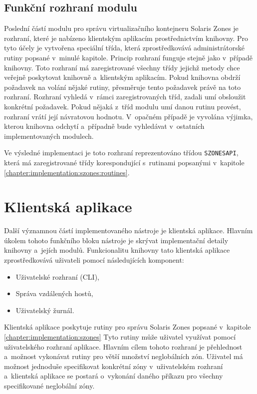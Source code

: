 \subsection{Funkční rozhraní modulu}
\label{chapter:implementation:szones:api}
Poslední částí modulu pro správu virtualizačního kontejneru Solaris Zones je rozhraní, které je nabízeno klientským aplikacím
prostřednictvím knihovny. Pro tyto účely je vytvořena speciální třída, která zprostředkovává administrátorské rutiny popsané 
v~minulé kapitole. Princip rozhraní funguje stejně jako v~případě knihovny. Toto rozhraní má zaregistrované všechny 
třídy jejichž metody chce veřejně poskytovat knihovně a~klientským aplikacím. Pokud knihovna obdrží požadavek na volání nějaké
rutiny, přesměruje tento požadavek právě na toto rozhraní. Rozhraní vyhledá v~rámci zaregistrovaných tříd, zadali umí obsloužit
konkrétní požadavek. Pokud nějaká z~tříd modulu umí danou rutinu provést, rozhraní vrátí její návratovou hodnotu. V~opačném případě
je vyvolána výjimka, kterou knihovna odchytí a~případně bude vyhledávat v~ostatních implementovaných modulech.

Ve výsledné implementaci je toto rozhraní reprezentováno třídou \verb|SZONESAPI|, která má zaregistrované třídy korespondující
s~rutinami popsanými v~kapitole \ref{chapter:implementation:szones:routines}.
\section{Klientská aplikace}
\label{chapter:implementation:client}
Další významnou částí implementovaného nástroje je klientská aplikace. Hlavním úkolem tohoto funkčního bloku nástroje je 
skrývat implementační detaily knihovny a~jejích modulů. Funkcionalitu knihovny tato klientská aplikace zprostředkovává
uživateli pomocí následujících komponent:
\begin{itemize}
 \item Uživatelské rozhraní (CLI),
 \item Správa vzdálených hostů,
 \item Uživatelský žurnál.
\end{itemize}
Klientská aplikace poskytuje rutiny pro správu Solaris Zones popsané v~kapitole \ref{chapter:implementation:szones}
Tyto rutiny může uživatel využívat pomocí uživatelského rozhraní aplikace. Hlavním cílem tohoto
rozhraní je přehlednost a~možnost vykonávat rutiny pro větší množství neglobálních zón. Uživatel má možnost jednoduše
specifikovat konkrétní zóny v~uživatelském rozhraní a~klientská aplikace se postará o~vykonání daného příkazu pro všechny
specifikované neglobální zóny.

